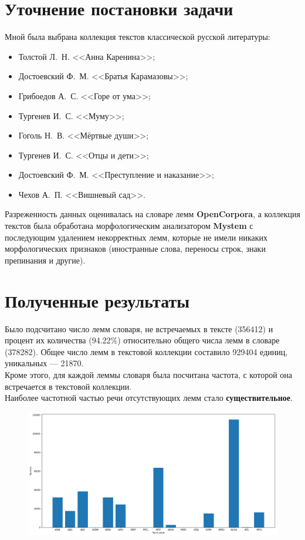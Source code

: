 \documentclass[oneside,final,12pt]{article}
\begin{document}
\section{Уточнение постановки задачи}

Мной была выбрана коллекция текстов классической русской литературы:

\begin{itemize}
	\item Толстой Л.~Н. <<Анна Каренина>>;
	\item Достоевский Ф.~М. <<Братья Карамазовы>>;
	\item Грибоедов А.~С. <<Горе от ума>>;
	\item Тургенев И.~С. <<Муму>>;
	\item Гоголь Н.~В. <<Мёртвые души>>;
	\item Тургенев И.~С. <<Отцы и дети>>;
	\item Достоевский Ф.~М. <<Преступление и наказание>>;
	\item Чехов А.~П. <<Вишневый сад>>.
\end{itemize}

Разреженность данных оценивалась на словаре лемм \textbf{OpenCorpora}, а коллекция текстов была обработана морфологическим анализатором \textbf{Mystem} с последующим удалением некорректных лемм, которые не имели никаких морфологических признаков (иностранные слова, переносы строк, знаки препинания и другие).

\section{Полученные результаты}

Было подсчитано число лемм словаря, не встречаемых в тексте (356412) и процент их количества (94.22\%) относительно общего числа лемм в словаре (378282). Общее число лемм в текстовой коллекции составило 929404 единиц, уникальных --- 21870.\\

Кроме этого, для каждой леммы словаря была посчитана частота, с которой она встречается в текстовой коллекции.\\

Наиболее частотной частью речи отсутствующих лемм стало \textbf{существительное}.

\begin{figure}[h]
	\includegraphics[width=\linewidth]{../pdf/output_8_0.png}
\end{figure}
\end{document}
